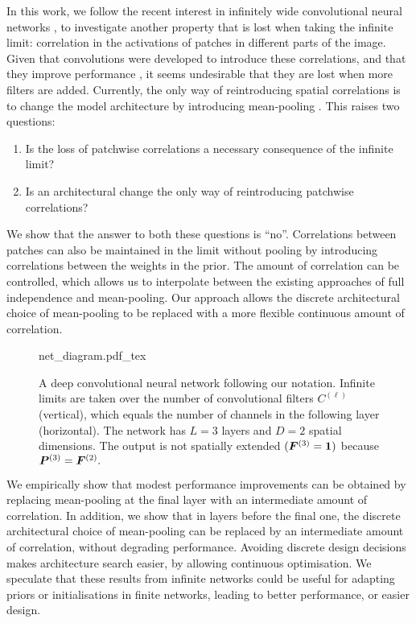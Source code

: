 \documentclass[accepted]{uai2021} %
\newcommand{\layerAs}[2]{Z^{(#1)}_{#2}(\vX)}
\newcommand{\layerC}[1]{C^{(#1)}}
\newcommand{\layersizebase}{\vF}
\newcommand{\layersize}[1]{{\layersizebase^{\bra{#1}}}}
\newcommand{\patchsizebase}{\vP}
\newcommand{\patchsize}[1]{{\patchsizebase^{\bra{#1}}}}
\newcommand{\0}{\boldsymbol{0}}
\newcommand{\1}{\boldsymbol{1}}
\begin{document}
In this work, we follow the recent interest in infinitely wide convolutional neural networks \citep{garriga2018infiniteconv,novak2019infiniteconv}, to investigate another property that is lost when taking the infinite limit: correlation in the activations of patches in different parts of the image.
Given that convolutions were developed to introduce these correlations, and that they improve performance \citep{arora2019exact}, it seems undesirable that they are lost when more filters are added.
Currently, the only way of reintroducing spatial correlations is to change the model architecture by introducing mean-pooling \citep{novak2019infiniteconv}. This raises two questions:
\begin{enumerate}[label=\textbf{\arabic*)}]
\itemsep0em
\item Is the loss of patchwise correlations a necessary consequence of the infinite limit?
\item Is an architectural change the only way of reintroducing patchwise correlations?
\end{enumerate}

We show that the answer to both these questions is ``no''. Correlations between patches can also be
maintained in the limit without pooling by introducing correlations between the weights in the prior. The amount of correlation can be controlled,
which allows us to interpolate between the existing approaches of full
independence and mean-pooling. Our approach allows the discrete architectural choice of mean-pooling to be replaced with a more flexible continuous amount of correlation.

\begin{figure*}[t]
  \centering
{%
  {net_diagram.pdf_tex}}
  \caption{A deep convolutional neural network following our notation. Infinite limits are taken over the number of convolutional filters $\layerC{\ell}$ (vertical), which equals the number of channels in the following layer (horizontal). The network has $L=3$ layers and $D=2$ spatial dimensions. The output is not spatially extended $(\layersize{3}=\1)$ because $\patchsize{3} = \layersize{2}.$}
  \label{fig:fancy-cnn}
\end{figure*}


We empirically show that modest performance improvements can be obtained by replacing mean-pooling at the final layer with an intermediate amount of correlation. In addition, we show that in layers before the final one, the discrete architectural choice of mean-pooling can be replaced by an intermediate amount of correlation, without degrading performance. Avoiding discrete design decisions makes architecture search easier, by allowing continuous optimisation.
We speculate that these results from infinite networks could be useful for adapting priors or initialisations in finite networks, leading to better performance, or easier design.
\end{document}
